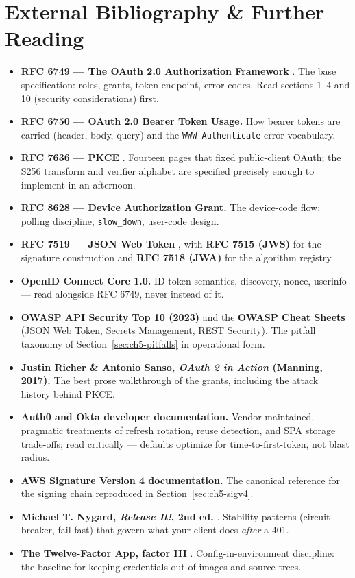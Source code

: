 \section{External Bibliography \& Further Reading}
\label{sec:ch5-bibliography}

\begin{itemize}
  \item \textbf{RFC 6749 --- The OAuth 2.0 Authorization Framework}
        \cite{rfc6749}. The base specification: roles, grants, token
        endpoint, error codes. Read sections 1--4 and 10 (security
        considerations) first.
  \item \textbf{RFC 6750 --- OAuth 2.0 Bearer Token Usage.} How bearer
        tokens are carried (header, body, query) and the
        \texttt{WWW-Authenticate} error vocabulary.
  \item \textbf{RFC 7636 --- PKCE} \cite{rfc7636}. Fourteen pages that fixed
        public-client OAuth; the S256 transform and verifier alphabet are
        specified precisely enough to implement in an afternoon.
  \item \textbf{RFC 8628 --- Device Authorization Grant.} The device-code
        flow: polling discipline, \texttt{slow\_down}, user-code design.
  \item \textbf{RFC 7519 --- JSON Web Token} \cite{rfc7519}, with
        \textbf{RFC 7515 (JWS)} for the signature construction and
        \textbf{RFC 7518 (JWA)} for the algorithm registry.
  \item \textbf{OpenID Connect Core 1.0.} ID token semantics, discovery,
        nonce, userinfo --- read alongside RFC 6749, never instead of it.
  \item \textbf{OWASP API Security Top 10 (2023)} \cite{owaspapisecurity}
        and the \textbf{OWASP Cheat Sheets} (JSON Web Token, Secrets
        Management, REST Security). The pitfall taxonomy of
        Section~\ref{sec:ch5-pitfalls} in operational form.
  \item \textbf{Justin Richer \& Antonio Sanso, \emph{OAuth 2 in Action}
        (Manning, 2017).} The best prose walkthrough of the grants,
        including the attack history behind PKCE.
  \item \textbf{Auth0 and Okta developer documentation.} Vendor-maintained,
        pragmatic treatments of refresh rotation, reuse detection, and SPA
        storage trade-offs; read critically --- defaults optimize for
        time-to-first-token, not blast radius.
  \item \textbf{AWS Signature Version 4 documentation.} The canonical
        reference for the signing chain reproduced in
        Section~\ref{sec:ch5-sigv4}.
  \item \textbf{Michael T. Nygard, \emph{Release It!}, 2nd ed.}
        \cite{nygard2018releaseit}. Stability patterns (circuit breaker,
        fail fast) that govern what your client does \emph{after} a 401.
  \item \textbf{The Twelve-Factor App, factor III} \cite{twelvefactor}.
        Config-in-environment discipline: the baseline for keeping
        credentials out of images and source trees.
\end{itemize}

